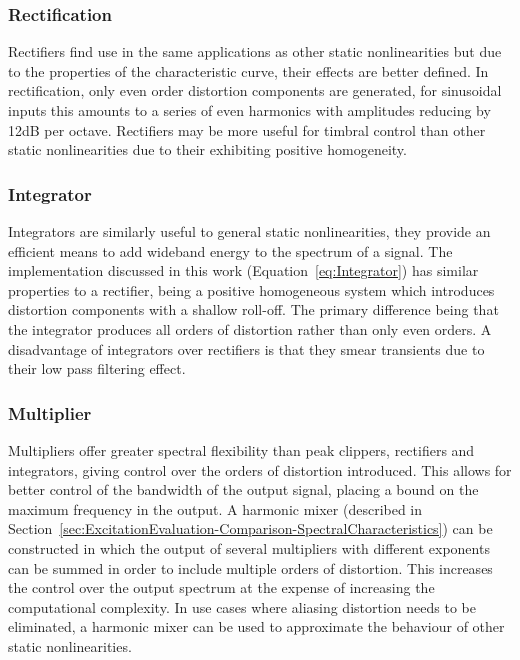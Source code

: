 		\subsubsection*{Rectification}
			Rectifiers find use in the same applications as other static nonlinearities but due to the
			properties of the characteristic curve, their effects are better defined. In rectification, only
			even order distortion components are generated, for sinusoidal inputs this amounts to a series of
			even harmonics with amplitudes reducing by 12dB per octave. Rectifiers may be more useful for
			timbral control than other static nonlinearities due to their exhibiting positive homogeneity.

		\subsubsection*{Integrator}
			Integrators are similarly useful to general static nonlinearities, they provide an efficient means
			to add wideband energy to the spectrum of a signal. The implementation discussed in this work
			(Equation~\ref{eq:Integrator}) has similar properties to a rectifier, being a positive homogeneous
			system which introduces distortion components with a shallow roll-off. The primary difference being
			that the integrator produces all orders of distortion rather than only even orders. A disadvantage
			of integrators over rectifiers is that they smear transients due to their low pass filtering
			effect.

		\subsubsection*{Multiplier}
			Multipliers offer greater spectral flexibility than peak clippers, rectifiers and integrators,
			giving control over the orders of distortion introduced. This allows for better control of the
			bandwidth of the output signal, placing a bound on the maximum frequency in the output. A harmonic
			mixer (described in Section~\ref{sec:ExcitationEvaluation-Comparison-SpectralCharacteristics}) can
			be constructed in which the output of several multipliers with different exponents can be summed in
			order to include multiple orders of distortion. This increases the control over the output spectrum
			at the expense of increasing the computational complexity. In use cases where aliasing distortion
			needs to be eliminated, a harmonic mixer can be used to approximate the behaviour of other static
			nonlinearities.

